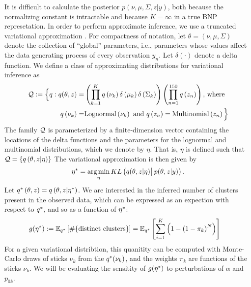 %
It is difficult to calculate the posterior $p\left(\nu, \mu, \Sigma, z \vert
y\right)$, both because the normalizing constant is intractable and because
$K=\infty$ in a true BNP represetation. In order to perform approximate
inference, we use a truncated variational approximation
\citep{blei:2006:dirichletbnp}. For compactness of notation, let $\theta =
\left(\nu, \mu, \Sigma\right)$ denote the collection of ``global'' parameters,
i.e., parameters whose values affect the data generating process of every
observation $y_n$.   Let $\delta\left(\cdot\right)$ denote a delta function. We
define a class of approximating distributions for variational inference as
%
\begin{align*}
\mathcal{Q} := \Big\{ q:
q(\theta, z) = &
\left(\prod_{k=1}^{K}q\left(\nu_{k}\right)\delta\left(\mu_{k}\right)
    \delta\left(\Sigma_{k}\right)\right)
    \left(\prod_{n=1}^{150}q\left(z_{n}\right) \right)\textrm{, where } \\
q\left(\nu_{k}\right) =& \mathrm{Lognormal}\left(\nu_k\right) \textrm{ and }
q\left(z_n\right) = \mathrm{Multinomial}\left(z_n\right)
\Big\}
\end{align*}
%
The family $\mathcal{Q}$ is parameterized by a finite-dimension vector containing
the locations of the delta functions and the parameters for the lognormal and
multinomial distributions, which we denote by $\eta$.  That is, $\eta$ is
defined such that $\mathcal{Q} = \left\{q\left(\theta, z \vert \eta
\right)\right\}$ The variational approximation is then given by
%
\begin{align}
\eta^{*} = \operatorname*{arg\,min}_{\eta} KL\left(
    q(\theta, z \vert \eta) \big\| p(\theta, z | y)
    \right). \label{eq:kl_objective}
\end{align}
%
Let $q^{*}\left(\theta, z\right) = q\left(\theta, z \vert \eta^{*}\right)$.
We are interested in the inferred number of clusters present in the observed
data, which can be expressed as an expection with respect to $q^{*}$,
and so as a function of $\eta^{*}$:
%
\begin{align}
g(\eta^{*}) :=
\mathbb{E}_{q^{*}} \left[ \#\{\text{distinct clusters}\} \right]  &=
\mathbb{E}_{q^{*}} \left[\sum_{i=1}^K \left(1 - \left(1 - \pi_k\right)^N\right)
    \right]
    \label{eq:expected_num_clusters}
\end{align}
%
For a given variational distribtion, this quanitity can be computed with
Monte-Carlo draws of sticks $\nu_k$ from the $q^{*}(\nu_k)$, and the weights $\pi_k$
are functions of the sticks $\nu_k$.
We will be evaluating the sensitity of $g(\eta^{*})$ to perturbations of
$\alpha$ and $p_{0k}$.
